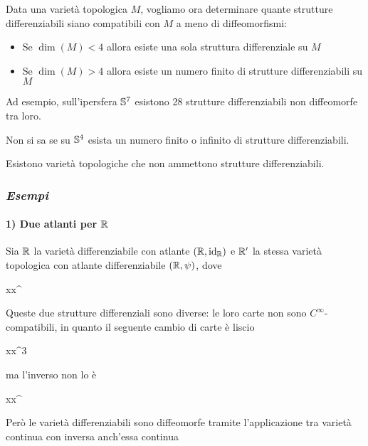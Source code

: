 Data una varietà topologica $ M $, vogliamo ora determinare quante strutture differenziabili siano compatibili con $ M $ a meno di diffeomorfismi:

\begin{itemize}
	\item Se $ \dim(M) < 4 $ allora esiste una sola struttura differenziale su $ M $
	
	\item Se $ \dim(M) > 4 $ allora esiste un numero finito di strutture differenziabili su $ M $
\end{itemize}

Ad esempio, sull'ipersfera $ \S^{7} $ esistono 28 strutture differenziabili non diffeomorfe tra loro.

\begin{remark}
	Non si sa se su $ \S^{4} $ esista un numero finito o infinito di strutture differenziabili.
\end{remark}

\begin{remark}
	Esistono varietà topologiche che non ammettono strutture differenziabili.
\end{remark}

\subsubsection{\textit{Esempi}}

\paragraph{1) Due atlanti per $ \R $}

Sia $ \R $ la varietà differenziabile con atlante $ (\R,\id_{\R}) $ e $ \R' $ la stessa varietà topologica con atlante differenziabile $ (\R,\psi) $, dove

\map{\psi}
	{\R}{\R}
	{x}{x^{}}

Queste due strutture differenziali sono diverse: le loro carte non sono $ C^{\infty} $-compatibili, in quanto il seguente cambio di carte è liscio

	{\R}{\R}
	{x}{x^{3}}

ma l'inverso non lo è
	
	{\R}{\R}
	{x}{x^{}}

Però le varietà differenziabili sono diffeomorfe tramite l'applicazione tra varietà continua con inversa anch'essa continua

